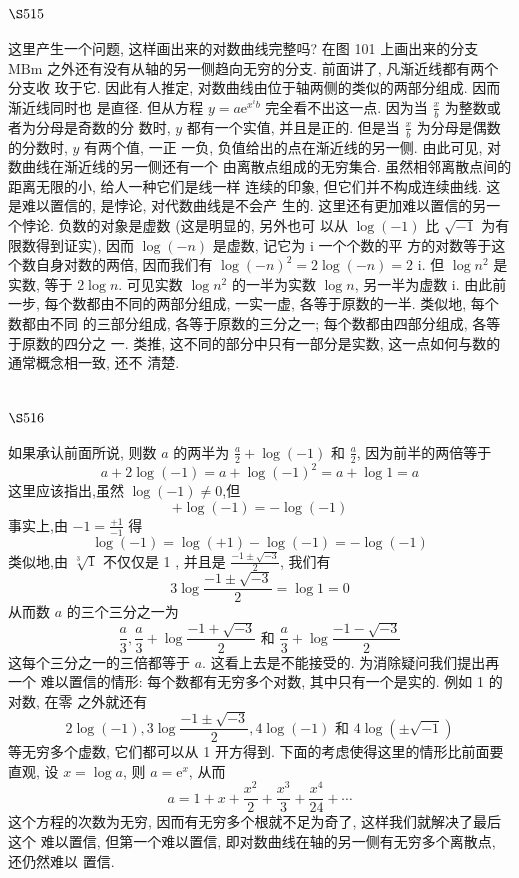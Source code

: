 \section{$\S 515$}

这里产生一个问题, 这样画出来的对数曲线完整吗? 在图 101 上画出来的分支 $\mathrm{MBm}$ 之外还有没有从轴的另一侧趋向无穷的分支. 前面讲了, 凡渐近线都有两个分支收 玫于它. 因此有人推定, 对数曲线由位于轴两侧的类似的两部分组成. 因而渐近线同时也 是直径. 但从方程 $y=a \mathrm{e}^{x^{i} b}$ 完全看不出这一点. 因为当 $\frac{x}{b}$ 为整数或者为分母是奇数的分 数时, $y$ 都有一个实值, 并且是正的. 但是当 $\frac{x}{b}$ 为分母是偶数的分数时, $y$ 有两个值, 一正 一负, 负值给出的点在渐近线的另一侧. 由此可见, 对数曲线在渐近线的另一侧还有一个 由离散点组成的无穷集合. 虽然相邻离散点间的距离无限的小, 给人一种它们是线一样 连续的印象, 但它们并不构成连续曲线. 这是难以置信的, 是悖论, 对代数曲线是不会产 生的. 这里还有更加难以置信的另一个悖论. 负数的对象是虚数 (这是明显的, 另外也可 以从 $\log (-1)$ 比 $\sqrt{-1}$ 为有限数得到证实), 因而 $\log (-n)$ 是虚数, 记它为 $\mathrm{i}$ 一个个数的平 方的对数等于这个数自身对数的两倍, 因而我们有 $\log (-n)^{2}=2 \log (-n)=2$ i. 但 $\log n^{2}$ 是实数, 等于 $2 \log n$. 可见实数 $\log n^{2}$ 的一半为实数 $\log n$, 另一半为虚数 i. 由此前一步, 每个数都由不同的两部分组成, 一实一虚, 各等于原数的一半. 类似地, 每个数都由不同 的三部分组成, 各等于原数的三分之一; 每个数都由四部分组成, 各等于原数的四分之 一. 类推, 这不同的部分中只有一部分是实数, 这一点如何与数的通常概念相一致, 还不 清楚.

\section{$\S 516$}

如果承认前面所说, 则数 $a$ 的两半为 $\frac{a}{2}+\log (-1)$ 和 $\frac{a}{2}$, 因为前半的两倍等于
\[
a+2 \log (-1)=a+\log (-1)^{2}=a+\log 1=a
\]
这里应该指出,虽然 $\log (-1) \neq 0$,但
\[
+\log (-1)=-\log (-1)
\]
事实上,由 $-1=\frac{+1}{-1}$ 得
\[
\log (-1)=\log (+1)-\log (-1)=-\log (-1)
\]
类似地,由 $\sqrt[3]{1}$ 不仅仅是 1 , 并且是 $\frac{-1 \pm \sqrt{-3}}{2}$, 我们有
\[
3 \log \frac{-1 \pm \sqrt{-3}}{2}=\log 1=0
\]
从而数 $a$ 的三个三分之一为
\[
\frac{a}{3}, \frac{a}{3}+\log \frac{-1+\sqrt{-3}}{2} \text { 和 } \frac{a}{3}+\log \frac{-1-\sqrt{-3}}{2}
\]
这每个三分之一的三倍都等于 $a$. 这看上去是不能接受的. 为消除疑问我们提出再一个 难以置信的情形: 每个数都有无穷多个对数, 其中只有一个是实的. 例如 1 的对数, 在零 之外就还有
\[
2 \log (-1), 3 \log \frac{-1 \pm \sqrt{-3}}{2}, 4 \log (-1) \text { 和 } 4 \log (\pm \sqrt{-1})
\]
等无穷多个虚数, 它们都可以从 1 开方得到. 下面的考虑使得这里的情形比前面要直观, 设 $x=\log a$, 则 $a=\mathrm{e}^{x}$, 从而
\[
a=1+x+\frac{x^{2}}{2}+\frac{x^{3}}{3}+\frac{x^{4}}{24}+\cdots
\]
这个方程的次数为无穷, 因而有无穷多个根就不足为奇了, 这样我们就解决了最后这个 难以置信, 但第一个难以置信, 即对数曲线在轴的另一侧有无穷多个离散点, 还仍然难以 置信.

